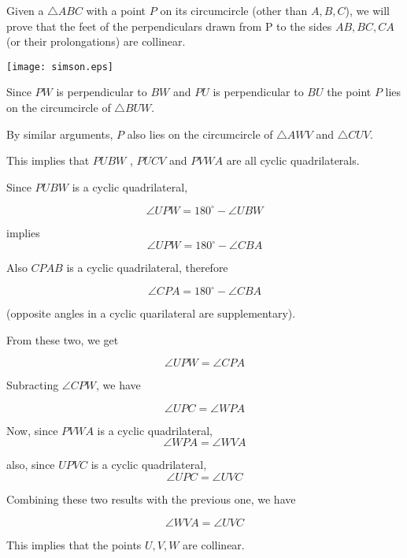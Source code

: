 \documentclass[12pt]{article}
\begin{document}
Given a  $\triangle ABC$ with a point $P$ on its circumcircle (other than $A,B,C$),                          
we will prove that the feet of the perpendiculars drawn from P to the sides $AB,BC,CA$                
(or their prolongations) are collinear.

\begin{center}
\texttt{[image: simson.eps]}
\end{center}

Since $PW$ is perpendicular to $BW$ and $PU$ is perpendicular to $BU$
the point $P$ lies on the circumcircle of $\triangle BUW $.                              

By similar arguments, $P$ also lies on the circumcircle of  $\triangle AWV$ and $\triangle CUV$.

This implies that  $PUBW$ ,  $PUCV$ and $PVWA$ are all cyclic quadrilaterals.

Since  $PUBW$ is a cyclic quadrilateral,

$$\angle UPW = 180^\circ -\angle UBW$$

implies  $$\angle UPW = 180^\circ -\angle CBA$$

Also $CPAB$ is a cyclic quadrilateral, therefore

$$\angle CPA = 180^\circ -\angle CBA$$

(opposite angles in a cyclic quarilateral are supplementary).

From these two, we get

$$\angle UPW =\angle CPA$$
                   
Subracting $\angle CPW$, we have

$$\angle UPC =\angle WPA$$

Now, since $PVWA$ is a cyclic quadrilateral,
$$\angle WPA = \angle WVA$$

also, since  $UPVC$  is a cyclic quadrilateral,
$$\angle UPC = \angle UVC$$

Combining these two results with the previous one, we have

$$\angle WVA =\angle UVC$$

This implies that the points $U, V, W$ are collinear.
\end{document}
